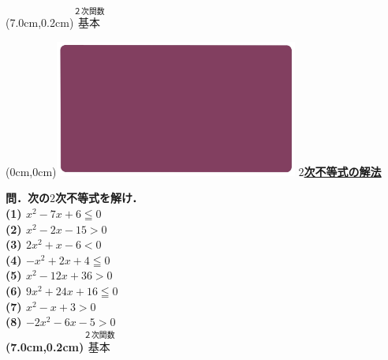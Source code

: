 \documentclass[10pt,
fleqn,
dvipdfmx,
uplatex
]{jsarticle}
\begin{document}
\at(7.0cm,0.2cm){\small\color{bradorange}$\overset{\text{２次関数}}{\text{基本}}$}


\newpage



\at(0cm,0cm){\includegraphics[width=8cm,bb=0 0 1920 1080]{./youtube/thumbnails/templates/smart_background/２次関数.jpeg}}
{\color{orange}\bf\boldmath\huge\underline{$2$次不等式の解法}}\vspace{0.3zw}

\scriptsize 
\bf\boldmath 問．次の$2$次不等式を解け．\\
(1)  $x^2-7x+6\leqq 0$\\
(2)  $x^2-2x-{15}>0$\\
(3)  $2x^2+x-6<0$\\
(4)  $-x^2+2x+4\leqq 0$\\
(5)  $x^2-{12}x+{36}>0$\\
(6)  $9x^2+{24}x+{16}\leqq 0$\\
(7)  $x^2-x+3>0$\\
(8)  $-2x^2-6x-5>0$\\

\at(7.0cm,0.2cm){\small\color{bradorange}$\overset{\text{２次関数}}{\text{基本}}$}
\end{document}
